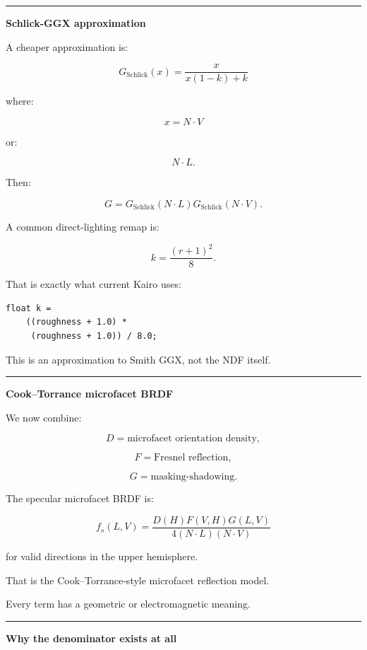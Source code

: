 \begin{center}\rule{0.5\linewidth}{0.5pt}\end{center}

\textbf{Schlick-GGX approximation}

A cheaper approximation is:

\[
\boxed{
G_{\text{Schlick}}(x)
=
\frac{x}
{x(1-k)+k}
}
\]

where:

\[
x=N\cdot V
\]

or:

\[
N\cdot L.
\]

Then:

\[
G=
G_{\text{Schlick}}(N\cdot L)
G_{\text{Schlick}}(N\cdot V).
\]

A common direct-lighting remap is:

\[
\boxed{
k=\frac{(r+1)^2}{8}.
}
\]

That is exactly what current Kairo uses:

\begin{verbatim}
float k =
    ((roughness + 1.0) *
     (roughness + 1.0)) / 8.0;
\end{verbatim}

This is an approximation to Smith GGX, not the NDF itself.

\begin{center}\rule{0.5\linewidth}{0.5pt}\end{center}

\textbf{Cook--Torrance microfacet BRDF}

We now combine:

\[
D=\text{microfacet orientation density},
\]

\[
F=\text{Fresnel reflection},
\]

\[
G=\text{masking-shadowing}.
\]

The specular microfacet BRDF is:

\[
\boxed{
f_s(L,V)
=
\frac{
D(H)F(V,H)G(L,V)
}{
4(N\cdot L)(N\cdot V)
}
}
\]

for valid directions in the upper hemisphere.

That is the Cook--Torrance-style microfacet reflection model.

Every term has a geometric or electromagnetic meaning.

\begin{center}\rule{0.5\linewidth}{0.5pt}\end{center}

\textbf{Why the denominator exists at all}

